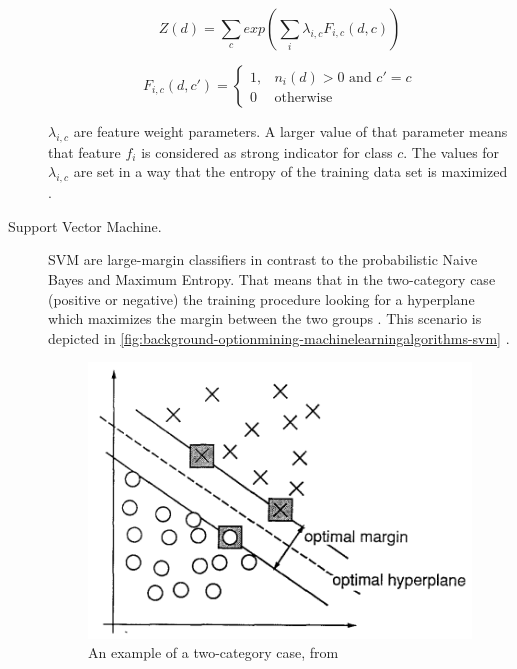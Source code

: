 \begin{description}
	\begin{equation}
		Z(d) = \sum_c exp(\sum_i \lambda_{i,c} F_{i,c}(d,c))
		\label{eq:background-optionmining-machinelearningalgorithms-maximumentropy_Zd}
	\end{equation}

	\begin{equation}
	F_{i,c}(d,c') = 
		\begin{cases}
		1, & n_i(d) > 0 \text{ and } c' = c \\
		0  & \text{otherwise}
		\end{cases}
		\label{eq:background-optionmining-machinelearningalgorithms-maximumentropy_fic}
	\end{equation}

	$\lambda_{i,c}$ are feature weight parameters. A larger value of that parameter means that feature $f_i$ is considered as strong indicator for class $c$.
	The values for $\lambda_{i,c}$ are set in a way that the entropy of the training data set is maximized \cite{Pang2002}.
		
	\item[Support Vector Machine.]
	\ac{SVM} are large-margin classifiers in contrast to the probabilistic Naive Bayes and Maximum Entropy.
	That means that in the two-category case (positive or negative) the training procedure looking for a hyperplane which maximizes the margin between the two groups \cite{Pang2002}.
	This scenario is depicted in \autoref{fig:background-optionmining-machinelearningalgorithms-svm} \cite[p. 275]{Cortes1995}.
		
	\begin{figure}[ht]
		\centering
		\includegraphics[width=.7\textwidth]{images/svm.png}
		\caption{An example of a two-category case, from \cite[p. 275]{Cortes1995}}
		\label{fig:background-optionmining-machinelearningalgorithms-svm}
	\end{figure}
	
\end{description}

